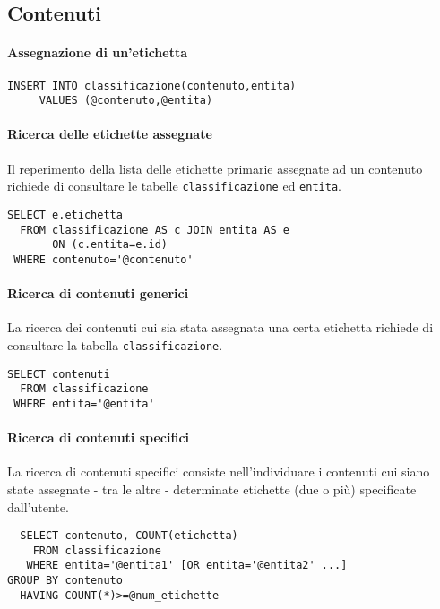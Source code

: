 \subsection*{Contenuti}
\paragraph{Assegnazione di un'etichetta}
\begin{verbatim}
INSERT INTO classificazione(contenuto,entita)
     VALUES (@contenuto,@entita)
\end{verbatim}

\paragraph{Ricerca delle etichette assegnate}
Il reperimento della lista delle etichette primarie assegnate ad un contenuto richiede di consultare le tabelle \texttt{classificazione} ed \texttt{entita}.
\begin{verbatim}
SELECT e.etichetta
  FROM classificazione AS c JOIN entita AS e
       ON (c.entita=e.id)
 WHERE contenuto='@contenuto'
\end{verbatim}

\paragraph{Ricerca di contenuti generici}
La ricerca dei contenuti cui sia stata assegnata una certa etichetta richiede di consultare la tabella \texttt{classificazione}.
\begin{verbatim}
SELECT contenuti
  FROM classificazione
 WHERE entita='@entita'
\end{verbatim}

\paragraph{Ricerca di contenuti specifici}
La ricerca di contenuti specifici consiste nell'individuare i contenuti cui siano state assegnate - tra le altre - determinate etichette (due o più) specificate dall'utente. 
\begin{verbatim}
  SELECT contenuto, COUNT(etichetta)
    FROM classificazione
   WHERE entita='@entita1' [OR entita='@entita2' ...]
GROUP BY contenuto
  HAVING COUNT(*)>=@num_etichette
\end{verbatim}
